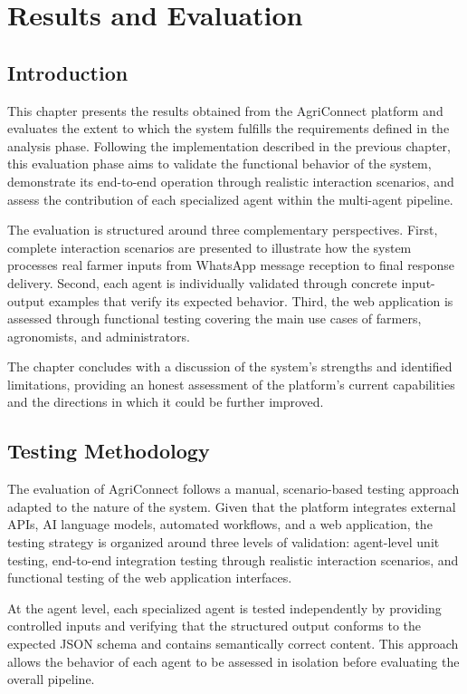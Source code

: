 \chapter{Results and Evaluation}

\section{Introduction}

This chapter presents the results obtained from the AgriConnect platform and evaluates the extent to which the system fulfills the requirements defined in the analysis phase. Following the implementation described in the previous chapter, this evaluation phase aims to validate the functional behavior of the system, demonstrate its end-to-end operation through realistic interaction scenarios, and assess the contribution of each specialized agent within the multi-agent pipeline.

The evaluation is structured around three complementary perspectives. First, complete interaction scenarios are presented to illustrate how the system processes real farmer inputs from WhatsApp message reception to final response delivery. Second, each agent is individually validated through concrete input-output examples that verify its expected behavior. Third, the web application is assessed through functional testing covering the main use cases of farmers, agronomists, and administrators.

The chapter concludes with a discussion of the system's strengths and identified limitations, providing an honest assessment of the platform's current capabilities and the directions in which it could be further improved.

\section{Testing Methodology}

The evaluation of AgriConnect follows a manual, scenario-based testing approach adapted to the nature of the system. Given that the platform integrates external APIs, AI language models, automated workflows, and a web application, the testing strategy is organized around three levels of validation: agent-level unit testing, end-to-end integration testing through realistic interaction scenarios, and functional testing of the web application interfaces.

At the agent level, each specialized agent is tested independently by providing controlled inputs and verifying that the structured output conforms to the expected JSON schema and contains semantically correct content. This approach allows the behavior of each agent to be assessed in isolation before evaluating the overall pipeline.

